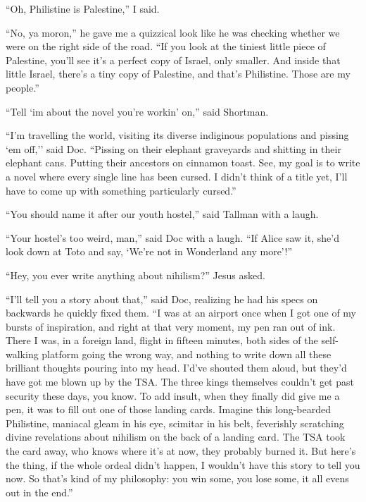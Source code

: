 \documentclass[oneside]{book}
\begin{document}
``Oh, Philistine is Palestine,'' I said.

``No, ya moron,'' he gave me a quizzical look like he was checking whether
we were on the right side of the road.
``If you look at the tiniest little piece of Palestine, you'll see it's a
perfect copy of Israel, only smaller.  And inside that little Israel, there's
a tiny copy of Palestine, and that's Philistine.  Those are my people.''

``Tell `im about the novel you're workin' on,'' said Shortman.

``I'm travelling the world, visiting its diverse indiginous populations
and pissing `em off,'' said Doc.  ``Pissing on their elephant graveyards
and shitting in their elephant cans.
Putting their ancestors on cinnamon toast.
See, my goal is to write a novel where every
single line has been cursed.  I didn't think of a title yet, I'll have
to come up with something particularly cursed.''

``You should name it after our youth hostel,'' said Tallman with a laugh.

``Your hostel's too weird, man,'' said Doc with a laugh.  ``If Alice saw it,
she'd look down at Toto and say, `We're not in Wonderland any more'!''

``Hey, you ever write anything about nihilism?'' Jesus asked.

``I'll tell you a story about that,'' said Doc, realizing he had his
specs on backwards he quickly fixed them.  ``I was at an airport once when I got
one of my bursts of inspiration, and right at that very moment, my pen ran out
of ink.  There I was, in a foreign land, flight in fifteen minutes, both sides of
the self-walking platform going the wrong way, and nothing to write down all these
brilliant thoughts pouring into my head.  I'd've shouted them aloud, but they'd have
got me blown up by the TSA.  The three kings themselves couldn't get past security
these days, you know.  To add insult, when they finally did give me a pen, it was to
fill out one of those landing cards.  Imagine this long-bearded Philistine, maniacal
gleam in his eye, scimitar in his belt, feverishly scratching divine revelations about
nihilism on the back of a landing card.  The TSA took the card away, who knows where
it's at now, they probably burned it.  But here's the thing, if the whole ordeal didn't
happen, I wouldn't have this story to tell you now.  So that's kind of my philosophy:
you win some, you lose some, it all evens out in the end.''
\end{document}
